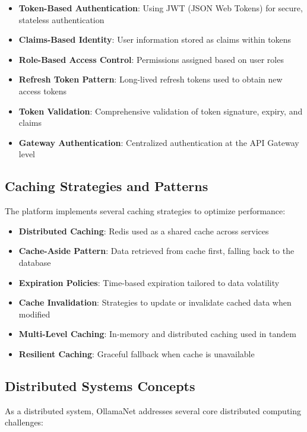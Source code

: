 \begin{itemize}
    \item \textbf{Token-Based Authentication}: Using JWT (JSON Web Tokens) for secure, stateless authentication
    \item \textbf{Claims-Based Identity}: User information stored as claims within tokens
    \item \textbf{Role-Based Access Control}: Permissions assigned based on user roles
    \item \textbf{Refresh Token Pattern}: Long-lived refresh tokens used to obtain new access tokens
    \item \textbf{Token Validation}: Comprehensive validation of token signature, expiry, and claims
    \item \textbf{Gateway Authentication}: Centralized authentication at the API Gateway level
\end{itemize}

\subsection{Caching Strategies and Patterns}

The platform implements several caching strategies to optimize performance:

\begin{itemize}
    \item \textbf{Distributed Caching}: Redis used as a shared cache across services
    \item \textbf{Cache-Aside Pattern}: Data retrieved from cache first, falling back to the database
    \item \textbf{Expiration Policies}: Time-based expiration tailored to data volatility
    \item \textbf{Cache Invalidation}: Strategies to update or invalidate cached data when modified
    \item \textbf{Multi-Level Caching}: In-memory and distributed caching used in tandem
    \item \textbf{Resilient Caching}: Graceful fallback when cache is unavailable
\end{itemize}

\subsection{Distributed Systems Concepts}

As a distributed system, OllamaNet addresses several core distributed computing challenges:

